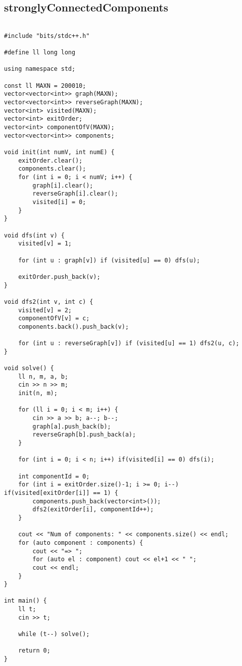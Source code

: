 \documentclass[landscape,twocolumn,10pt,a4paper]{article}
\begin{document}
\subsection{stronglyConnectedComponents}
\begin{verbatim}

#include "bits/stdc++.h"

#define ll long long

using namespace std;

const ll MAXN = 200010;
vector<vector<int>> graph(MAXN);
vector<vector<int>> reverseGraph(MAXN);
vector<int> visited(MAXN);
vector<int> exitOrder;
vector<int> componentOfV(MAXN);
vector<vector<int>> components;

void init(int numV, int numE) {
    exitOrder.clear();
    components.clear();
    for (int i = 0; i < numV; i++) {
        graph[i].clear();
        reverseGraph[i].clear();
        visited[i] = 0;
    }
}

void dfs(int v) {
    visited[v] = 1;

    for (int u : graph[v]) if (visited[u] == 0) dfs(u);

    exitOrder.push_back(v);
}

void dfs2(int v, int c) {
    visited[v] = 2;
    componentOfV[v] = c;
    components.back().push_back(v);

    for (int u : reverseGraph[v]) if (visited[u] == 1) dfs2(u, c);
}

void solve() {
    ll n, m, a, b;
    cin >> n >> m;
    init(n, m);

    for (ll i = 0; i < m; i++) {
        cin >> a >> b; a--; b--;
        graph[a].push_back(b);
        reverseGraph[b].push_back(a);
    }

    for (int i = 0; i < n; i++) if(visited[i] == 0) dfs(i);

    int componentId = 0;
    for (int i = exitOrder.size()-1; i >= 0; i--) if(visited[exitOrder[i]] == 1) {
        components.push_back(vector<int>());
        dfs2(exitOrder[i], componentId++);
    }

    cout << "Num of components: " << components.size() << endl;
    for (auto component : components) {
        cout << "=> ";
        for (auto el : component) cout << el+1 << " ";
        cout << endl;
    }
}

int main() {
    ll t;
    cin >> t;

    while (t--) solve();

    return 0;
}\end{verbatim}
\end{document}
